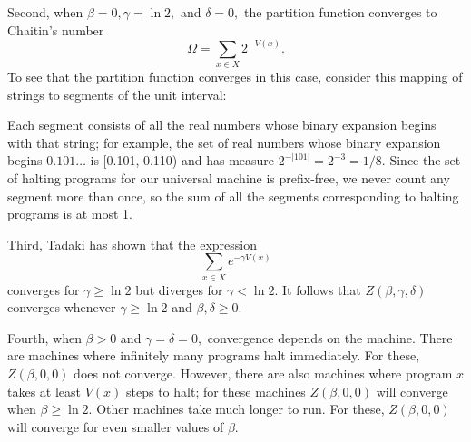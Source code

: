 \documentclass[12pt,twoside,openright]{report}
\begin{document}
Second, when $\beta = 0, \gamma = \ln 2,$ and $\delta = 0,$ the partition function converges to Chaitin's number
\[ \Omega = \sum_{x \in X} 2^{-V(x)}.  \]
To see that the partition function converges in this case, consider this mapping of strings to segments of the unit interval: 
\begin{center}
\end{center}

Each segment consists of all the real numbers whose binary expansion begins with that string; for example, the set of real numbers whose binary expansion begins $0.101\ldots$
is [0.101, 0.110) and has measure $2^{-|101|} = 2^{-3} = 1/8.$
Since the set of halting programs for our universal machine is prefix-free, we never count any segment more than once, so the sum of all the segments corresponding to halting programs is at most 1.

Third, Tadaki has shown \cite{Tadaki2002} that the expression  
\[ \sum_{x \in X} e^{-\gamma V(x)} \]
converges for $\gamma \ge \ln 2$ but diverges for $\gamma < \ln 2.$ 
It follows that $Z(\beta, \gamma, \delta)$
converges whenever $\gamma \ge \ln 2$ and $\beta, \delta \ge 0$.  

Fourth, when $\beta>0$ and $\gamma=\delta=0,$ convergence depends on the machine.  There are machines where infinitely many programs halt immediately.  For these, $Z(\beta,0,0)$ does not converge. However, there are also machines where program $x$ takes at least 
$V(x)$ steps to halt; for these machines $Z(\beta,0,0)$ will converge when $\beta \ge \ln 2.$  Other machines take much longer to run. For these, $Z(\beta,0,0)$ will converge for even smaller values of $\beta$.  
\end{document}
